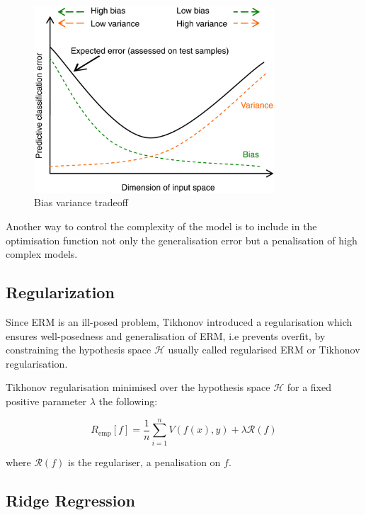 \begin{figure}[!h]
  \centering
  \includegraphics[width=0.8\textwidth]{img/biasvariancetradeoff}
  \caption{Bias variance tradeoff}
  \label{fig:bvtradeoff}
\end{figure}

Another way to control the complexity of the model is to include in the optimisation function not only the generalisation error but a penalisation of high complex models. 


\subsection{Regularization}
Since ERM is an ill-posed problem, Tikhonov introduced a regularisation which ensures well-posedness and generalisation of ERM, i.e prevents overfit, by constraining the hypothesis space $\mathcal{H}$ usually called regularised ERM or Tikhonov regularisation.

Tikhonov regularisation minimised over the hypothesis space $\mathcal{H}$ for a fixed positive parameter $\lambda$ the following:

\begin{equation} 
\label{eq:rerm}
R_{\text{emp}}[f] = \frac{1}{n} \sum_{i=1}^n V(f(x),y) + \lambda \mathcal{R}(f)
\end{equation}

\noindent where $\mathcal{R}(f)$ is the regulariser, a penalisation on $f$.




\subsection{Ridge Regression}



